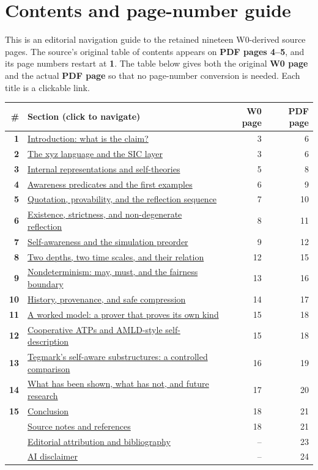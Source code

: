 \documentclass[11pt,letterpaper]{article}
\begin{document}
\section*{Contents and page-number guide}
\noindent\small This is an editorial navigation guide to the retained nineteen W0-derived source pages. The source's original table of contents appears on \textbf{PDF pages 4--5}, and its page numbers restart at \textbf{1}. The table below gives both the original \textbf{W0 page} and the actual \textbf{PDF page} so that no page-number conversion is needed. Each title is a clickable link.\par\medskip
\renewcommand{\arraystretch}{1.15}
\setlength{\tabcolsep}{3pt}
\footnotesize
\begin{tabularx}{\linewidth}{@{}rXrr@{}}
\toprule
\# & Section (click to navigate) & W0 page & PDF page \\
\midrule
\textbf{1} & \hyperlink{w0p3}{Introduction: what is the claim?} & 3 & 6 \\
\textbf{2} & \hyperlink{w0p3}{The xyz language and the SIC layer} & 3 & 6 \\
\textbf{3} & \hyperlink{w0p5}{Internal representations and self-theories} & 5 & 8 \\
\textbf{4} & \hyperlink{w0p6}{Awareness predicates and the first examples} & 6 & 9 \\
\textbf{5} & \hyperlink{w0p7}{Quotation, provability, and the reflection sequence} & 7 & 10 \\
\textbf{6} & \hyperlink{w0p8}{Existence, strictness, and non-degenerate reflection} & 8 & 11 \\
\textbf{7} & \hyperlink{w0p9}{Self-awareness and the simulation preorder} & 9 & 12 \\
\textbf{8} & \hyperlink{w0p12}{Two depths, two time scales, and their relation} & 12 & 15 \\
\textbf{9} & \hyperlink{w0p13}{Nondeterminism: may, must, and the fairness boundary} & 13 & 16 \\
\textbf{10} & \hyperlink{w0p14}{History, provenance, and safe compression} & 14 & 17 \\
\textbf{11} & \hyperlink{w0p15}{A worked model: a prover that proves its own kind} & 15 & 18 \\
\textbf{12} & \hyperlink{w0p15}{Cooperative ATPs and AMLD-style self-description} & 15 & 18 \\
\textbf{13} & \hyperlink{w0p16}{Tegmark's self-aware substructures: a controlled comparison} & 16 & 19 \\
\textbf{14} & \hyperlink{w0p17}{What has been shown, what has not, and future research} & 17 & 20 \\
\textbf{15} & \hyperlink{w0p18}{Conclusion} & 18 & 21 \\
\midrule
 & \hyperlink{w0p18}{Source notes and references} & 18 & 21 \\
 & \hyperlink{editorialback}{Editorial attribution and bibliography} & -- & 23 \\
 & \hyperlink{disclaimer}{AI disclaimer} & -- & 24 \\
\bottomrule
\end{tabularx}
\end{document}
